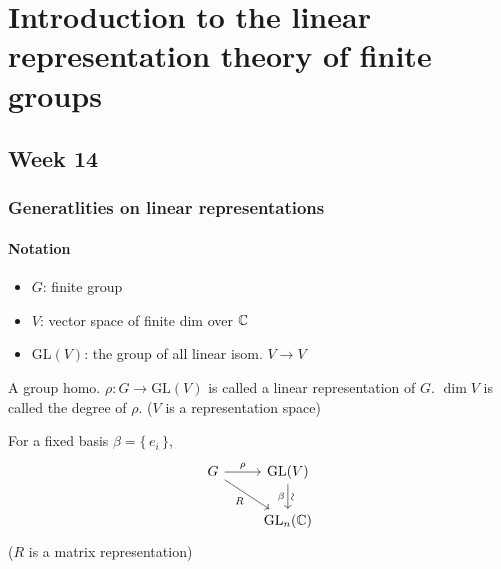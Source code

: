 \section{Introduction to the linear representation theory of finite groups}
\subsection{Week 14}
\subsubsection{Generatlities on linear representations}
\paragraph{Notation}

\begin{itemize}
  \item $G$: finite group
  \item $V$: vector space of finite dim over $\mathbb{C}$
  \item $\text{GL}(V)$: the group of all linear isom. $V \to V$
\end{itemize}

\begin{definition}
  A group homo. $\rho: G \to \text{GL}(V)$ is called a linear representation
  of $G$.
  $\dim V$ is called the degree of $\rho$.
  ($V$ is a representation space)

  For a fixed basis $\beta = \{\, e_i \,\}$,
  \[
    \begin{tikzcd}
      G \arrow{r}{\rho} \arrow[swap]{dr}{R} & \text{GL}(V) \arrow[d, "\beta"', "\rotatebox{90}{\(\sim\)}"] \\
                                            & \text{GL}_n(\Cb)
    \end{tikzcd}
  \]
  ($R$ is a matrix representation)
\end{definition}

